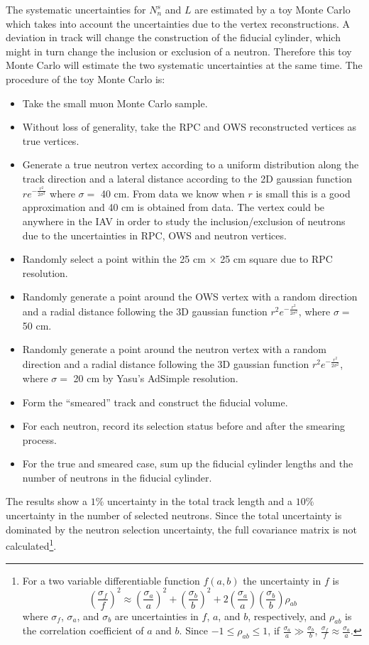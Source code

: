 The systematic uncertainties for $N_n^s$ and $L$ are estimated by a toy Monte Carlo which takes into account the uncertainties due to the vertex reconstructions. A deviation in track will change the construction of the fiducial cylinder, which might in turn change the inclusion or exclusion of a neutron. Therefore this toy Monte Carlo will estimate the two systematic uncertainties at the same time. The procedure of the toy Monte Carlo is:
\begin{itemize}
	\item Take the small muon Monte Carlo sample.
	\item Without loss of generality, take the RPC and OWS reconstructed vertices as true vertices.
	\item Generate a true neutron vertex according to a uniform distribution along the track direction and a lateral distance according to the 2D gaussian function $re^{-\frac{r^2}{2\sigma^2}}$ where $\sigma=$ 40 cm. From data we know when $r$ is small this is a good approximation and 40 cm is obtained from data. The vertex could be anywhere in the IAV in order to study the inclusion/exclusion of neutrons due to the uncertainties in RPC, OWS and neutron vertices.
	\item Randomly select a point within the 25 cm $\times$ 25 cm square due to RPC resolution.
	\item Randomly generate a point around the OWS vertex with a random direction and a radial distance following the 3D gaussian function $r^2e^{-\frac{r^2}{2\sigma^2}}$, where $\sigma=$ 50 cm.
	\item Randomly generate a point around the neutron vertex with a random direction and a radial distance following the 3D gaussian function $r^2e^{-\frac{r^2}{2\sigma^2}}$, where $\sigma=$ 20 cm by Yasu's AdSimple resolution.
	\item Form the ``smeared'' track and construct the fiducial volume.
	\item For each neutron, record its selection status before and after the smearing process.
	\item For the true and smeared case, sum up the fiducial cylinder lengths and the number of neutrons in the fiducial cylinder.
\end{itemize}
The results show a $1\%$ uncertainty in the total track length and a $10\%$ uncertainty in the number of selected neutrons. Since the total uncertainty is dominated by the neutron selection uncertainty, the full covariance matrix is not calculated\footnote{
For a two variable differentiable function $f(a,b)$ the uncertainty in $f$ is
\begin{equation}
	\left(\frac{\sigma_f}{f}\right)^2\approx\left(\frac{\sigma_a}{a}\right)^2+\left(\frac{\sigma_b}{b}\right)^2+2\left(\frac{\sigma_a}{a}\right)\left(\frac{\sigma_b}{b}\right)\rho_{ab}
\end{equation}
where $\sigma_f$, $\sigma_a$, and $\sigma_b$ are uncertainties in $f$, $a$, and $b$, respectively, and $\rho_{ab}$ is the correlation coefficient of $a$ and $b$. Since $-1 \leq \rho_{ab} \leq 1$, if $\frac{\sigma_a}{a}\gg\frac{\sigma_b}{b}$, $\frac{\sigma_f}{f}\approx\frac{\sigma_a}{a}$.
}.



